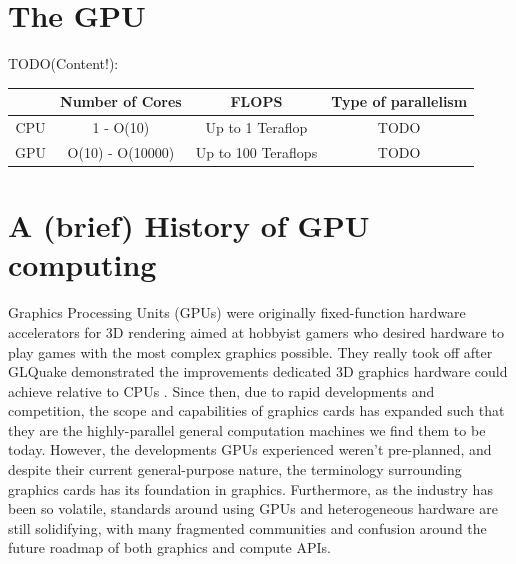 \documentclass[a4paper,12pt,twoside,openright]{report}
\begin{document}

\section{The GPU}

\label{sec:gpu_hardware}

TODO(Content!):

\begin{center}
\begin{tabular}{||c||c|c|c||}
\hline
        & Number of Cores  & FLOPS                                         & Type of parallelism \\
\hline
\hline
CPU     & 1 - O(10)        & Up to 1 Teraflop \cite{IntelTeraFlop}         & TODO                \\
\hline
GPU     & O(10) - O(10000) & Up to 100 Teraflops \cite{NVIDIA100TeraFlops} & TODO                \\
\hline
\end{tabular}
\end{center}



\section{A (brief) History of GPU computing}

\label{sec:history_gpu}

Graphics Processing Units (GPUs) were originally fixed-function hardware
accelerators for 3D rendering aimed at hobbyist gamers who desired hardware to
play games with the most complex graphics possible. They really took off after
GLQuake demonstrated the improvements dedicated 3D graphics hardware could
achieve relative to CPUs \cite{GLQuake}. Since then, due to rapid developments
and competition, the scope and capabilities of graphics cards has expanded such
that they are the highly-parallel general computation machines we find them to
be today. However, the developments GPUs experienced weren't pre-planned, and
despite their current general-purpose nature, the terminology surrounding
graphics cards has its foundation in graphics. Furthermore, as the industry has
been so volatile, standards around using GPUs and heterogeneous hardware are
still solidifying, with many fragmented communities and confusion around the
future roadmap of both graphics and compute APIs.
\end{document}
